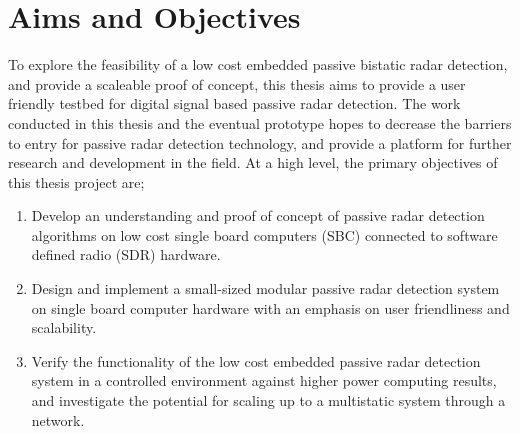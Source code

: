 

\section{Aims and Objectives} \label{sec:aims}
To explore the feasibility of a low cost embedded passive bistatic radar detection, and provide a scaleable proof of concept, this thesis aims to provide a user friendly testbed for digital signal based passive radar detection. The work conducted in this thesis and the eventual prototype hopes to decrease the barriers to entry for passive radar detection technology, and provide a platform for further research and development in the field. At a high level, the primary objectives of this thesis project are;
\begin{enumerate}
    \item Develop an understanding and proof of concept of passive radar detection algorithms on low cost single board computers (SBC) connected to software defined radio (SDR) hardware.
    \item Design and implement a small-sized modular passive radar detection system on single board computer hardware with an emphasis on user friendliness and scalability.
    \item Verify the functionality of the low cost embedded passive radar detection system in a controlled environment against higher power computing results, and investigate the potential for scaling up to a multistatic system through a network. 
\end{enumerate}

